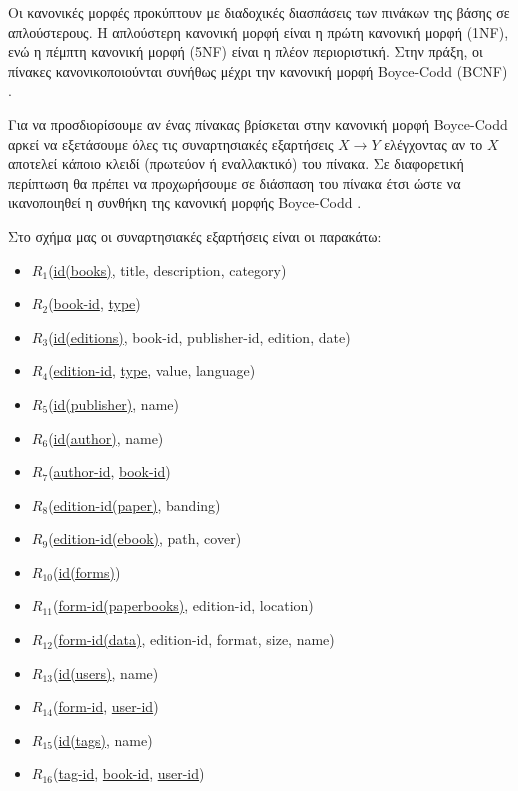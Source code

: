 \documentclass{assignment}
\begin{document}
Οι κανονικές μορφές προκύπτουν με διαδοχικές διασπάσεις των πινάκων της βάσης σε απλούστερους. Η απλούστερη κανονική μορφή είναι η πρώτη κανονική μορφή (1NF), ενώ η πέμπτη κανονική μορφή (5NF) είναι η πλέον περιοριστική. Στην πράξη, οι πίνακες κανονικοποιούνται συνήθως μέχρι την κανονική μορφή Boyce-Codd (BCNF) \cite{baseis_manolopoulos}.

Για να προσδιορίσουμε αν ένας πίνακας βρίσκεται στην κανονική μορφή Boyce-Codd αρκεί να εξετάσουμε όλες τις συναρτησιακές εξαρτήσεις $X \rightarrow Y$ ελέγχοντας αν το $X$ αποτελεί κάποιο κλειδί (πρωτεύον ή εναλλακτικό) του πίνακα. Σε διαφορετική περίπτωση θα πρέπει να προχωρήσουμε σε διάσπαση του πίνακα έτσι ώστε να ικανοποιηθεί η συνθήκη της κανονική μορφής Boyce-Codd \cite{baseis_manolopoulos, wiki:boyce-codd}.

Στο σχήμα μας οι συναρτησιακές εξαρτήσεις είναι οι παρακάτω:
\begin{itemize}
\item $R_1$(\underline{id(books)}, title, description, category)
\item $R_2$(\underline{book-id}, \underline{type})
\item $R_3$(\underline{id(editions)}, book-id, publisher-id, edition, date)
\item $R_4$(\underline{edition-id}, \underline{type}, value, language)
\item $R_5$(\underline{id(publisher)}, name)
\item $R_6$(\underline{id(author)}, name)
\item $R_7$(\underline{author-id}, \underline{book-id})
\item $R_8$(\underline{edition-id(paper)}, banding)
\item $R_9$(\underline{edition-id(ebook)}, path, cover)
\item $R_{10}$(\underline{id(forms)})
\item $R_{11}$(\underline{form-id(paperbooks)}, edition-id, location)
\item $R_{12}$(\underline{form-id(data)}, edition-id, format, size, name)
\item $R_{13}$(\underline{id(users)}, name)
\item $R_{14}$(\underline{form-id}, \underline{user-id})
\item $R_{15}$(\underline{id(tags)}, name)
\item $R_{16}$(\underline{tag-id}, \underline{book-id}, \underline{user-id})
\end{itemize}
\end{document}
